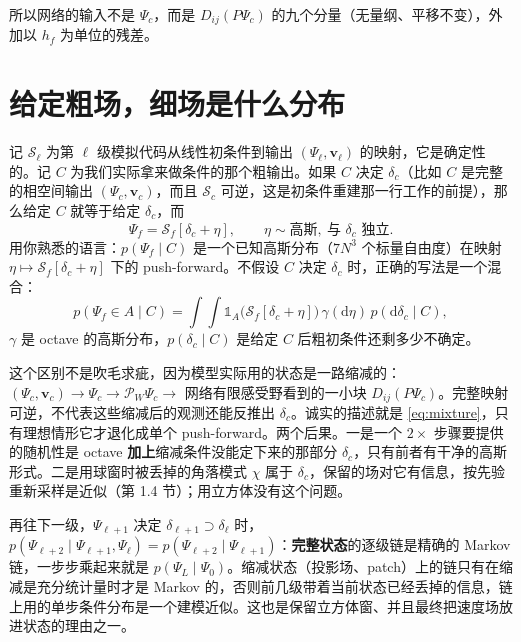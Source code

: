 \documentclass[11pt,UTF8,fontset=none]{ctexart}
\newcommand{\dd}{\mathrm{d}}
\newcommand{\PW}{\mathcal P_W}
\newcommand{\Sim}{\mathcal S}
\begin{document}
所以网络的输入不是 $\Psi_c$，而是 $D_{ij}(P\Psi_c)$ 的九个分量（无量纲、平移不变），外加以 $h_f$ 为单位的残差。

\section{给定粗场，细场是什么分布}

记 $\Sim_\ell$ 为第 $\ell$ 级模拟代码从线性初条件到输出 $(\Psi_\ell,\mathbf v_\ell)$ 的映射，它是确定性的。记 $C$ 为我们实际拿来做条件的那个粗输出。如果 $C$ 决定 $\delta_c$（比如 $C$ 是完整的相空间输出 $(\Psi_c,\mathbf v_c)$，而且 $\Sim_c$ 可逆，这是初条件重建那一行工作的前提），那么给定 $C$ 就等于给定 $\delta_c$，而
\begin{equation}
\Psi_f=\Sim_f[\delta_c+\eta],\qquad \eta\sim\text{高斯},\ \text{与 }\delta_c\text{ 独立}.
\end{equation}
用你熟悉的语言：$p(\Psi_f\mid C)$ 是一个已知高斯分布（$7N^3$ 个标量自由度）在映射 $\eta\mapsto\Sim_f[\delta_c+\eta]$ 下的 push-forward。不假设 $C$ 决定 $\delta_c$ 时，正确的写法是一个混合：
\begin{equation}
p(\Psi_f\in A\mid C)=\int\!\!\int\mathbb 1_A\big(\Sim_f[\delta_c+\eta]\big)\,\gamma(\dd\eta)\,p(\dd\delta_c\mid C),
\label{eq:mixture}
\end{equation}
$\gamma$ 是 octave 的高斯分布，$p(\delta_c\mid C)$ 是给定 $C$ 后粗初条件还剩多少不确定。

这个区别不是吹毛求疵，因为模型实际用的状态是一路缩减的：$(\Psi_c,\mathbf v_c)\to\Psi_c\to\PW\Psi_c\to$ 网络有限感受野看到的一小块 $D_{ij}(P\Psi_c)$。完整映射可逆，不代表这些缩减后的观测还能反推出 $\delta_c$。诚实的描述就是 \eqref{eq:mixture}，只有理想情形它才退化成单个 push-forward。两个后果。一是一个 $2\times$ 步骤要提供的随机性是 octave \textbf{加上}缩减条件没能定下来的那部分 $\delta_c$，只有前者有干净的高斯形式。二是用球窗时被丢掉的角落模式 $\chi$ 属于 $\delta_c$，保留的场对它有信息，按先验重新采样是近似（第 1.4 节）；用立方体没有这个问题。

再往下一级，$\Psi_{\ell+1}$ 决定 $\delta_{\ell+1}\supset\delta_\ell$ 时，$p(\Psi_{\ell+2}\mid\Psi_{\ell+1},\Psi_\ell)=p(\Psi_{\ell+2}\mid\Psi_{\ell+1})$：\textbf{完整状态}的逐级链是精确的 Markov 链，一步步乘起来就是 $p(\Psi_L\mid\Psi_0)$。缩减状态（投影场、patch）上的链只有在缩减是充分统计量时才是 Markov 的，否则前几级带着当前状态已经丢掉的信息，链上用的单步条件分布是一个建模近似。这也是保留立方体窗、并且最终把速度场放进状态的理由之一。
\end{document}
